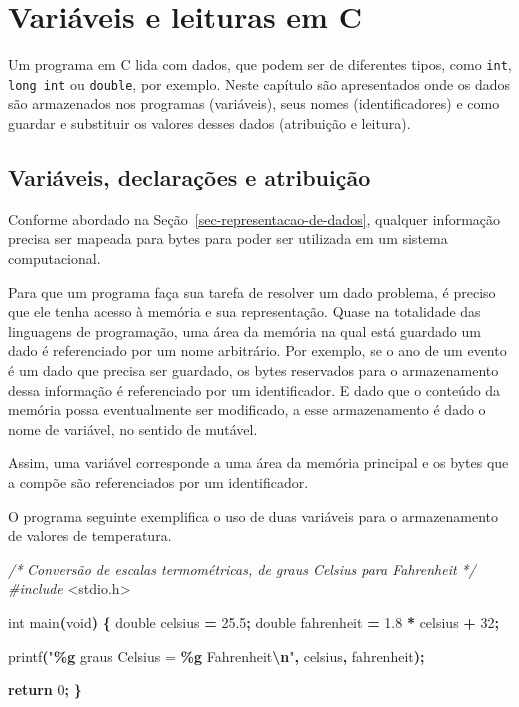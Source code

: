 \documentclass[
  11pt,
  a4paper,
]{scrbook}
\newenvironment{Shaded}{\begin{snugshade}}{\end{snugshade}}
\newcommand{\CommentTok}[1]{\textcolor[rgb]{0.56,0.35,0.01}{\textit{#1}}}
\newcommand{\ControlFlowTok}[1]{\textcolor[rgb]{0.13,0.29,0.53}{\textbf{#1}}}
\newcommand{\DataTypeTok}[1]{\textcolor[rgb]{0.13,0.29,0.53}{#1}}
\newcommand{\DecValTok}[1]{\textcolor[rgb]{0.00,0.00,0.81}{#1}}
\newcommand{\FloatTok}[1]{\textcolor[rgb]{0.00,0.00,0.81}{#1}}
\newcommand{\ImportTok}[1]{#1}
\newcommand{\NormalTok}[1]{#1}
\newcommand{\OperatorTok}[1]{\textcolor[rgb]{0.81,0.36,0.00}{\textbf{#1}}}
\newcommand{\PreprocessorTok}[1]{\textcolor[rgb]{0.56,0.35,0.01}{\textit{#1}}}
\newcommand{\SpecialCharTok}[1]{\textcolor[rgb]{0.81,0.36,0.00}{\textbf{#1}}}
\newcommand{\StringTok}[1]{\textcolor[rgb]{0.31,0.60,0.02}{#1}}
\begin{document}
\chapter{Variáveis e leituras em C}\label{sec-variaveis-e-leitura}

Um programa em C lida com dados, que podem ser de diferentes tipos, como
\texttt{int}, \texttt{long\ int} ou \texttt{double}, por exemplo. Neste
capítulo são apresentados onde os dados são armazenados nos programas
(variáveis), seus nomes (identificadores) e como guardar e substituir os
valores desses dados (atribuição e leitura).

\section{Variáveis, declarações e
atribuição}\label{variuxe1veis-declarauxe7uxf5es-e-atribuiuxe7uxe3o}

Conforme abordado na Seção~\ref{sec-representacao-de-dados}, qualquer
informação precisa ser mapeada para bytes para poder ser utilizada em um
sistema computacional.

Para que um programa faça sua tarefa de resolver um dado problema, é
preciso que ele tenha acesso à memória e sua representação. Quase na
totalidade das linguagens de programação, uma área da memória na qual
está guardado um dado é referenciado por um nome arbitrário. Por
exemplo, se o ano de um evento é um dado que precisa ser guardado, os
bytes reservados para o armazenamento dessa informação é referenciado
por um identificador. E dado que o conteúdo da memória possa
eventualmente ser modificado, a esse armazenamento é dado o nome de
variável, no sentido de mutável.

 Assim, uma variável corresponde a uma área da memória
principal e os bytes que a compõe são referenciados por um
identificador.

O programa seguinte exemplifica o uso de duas variáveis para o
armazenamento de valores de temperatura.

\begin{Shaded}
\begin{Highlighting}[]
\CommentTok{/*}
\CommentTok{Conversão de escalas termométricas, de graus Celsius para Fahrenheit}
\CommentTok{*/}
\PreprocessorTok{\#include }\ImportTok{\textless{}stdio.h\textgreater{}}

\DataTypeTok{int}\NormalTok{ main}\OperatorTok{(}\DataTypeTok{void}\OperatorTok{)} \OperatorTok{\{}
    \DataTypeTok{double}\NormalTok{ celsius }\OperatorTok{=} \FloatTok{25.5}\OperatorTok{;} 
    \DataTypeTok{double}\NormalTok{ fahrenheit }\OperatorTok{=} \FloatTok{1.8} \OperatorTok{*}\NormalTok{ celsius }\OperatorTok{+} \DecValTok{32}\OperatorTok{;}

\NormalTok{    printf}\OperatorTok{(}\StringTok{"}\SpecialCharTok{\%g}\StringTok{ graus Celsius = }\SpecialCharTok{\%g}\StringTok{ Fahrenheit}\SpecialCharTok{\textbackslash{}n}\StringTok{"}\OperatorTok{,}\NormalTok{ celsius}\OperatorTok{,}\NormalTok{ fahrenheit}\OperatorTok{);}

    \ControlFlowTok{return} \DecValTok{0}\OperatorTok{;}
\OperatorTok{\}}
\end{Highlighting}
\end{Shaded}
\end{document}
